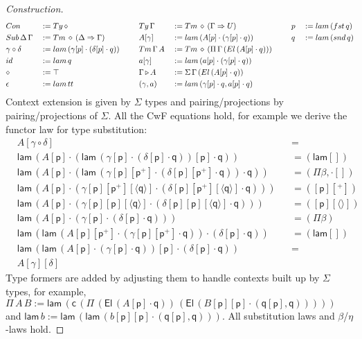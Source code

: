 \documentclass[a4paper,UKenglish,cleveref, autoref, thm-restate]{lipics-v2021}
\newcommand{\Ra}{\Rightarrow}
\newcommand{\Ty}{\mathsf{Ty}}
\newcommand{\Tm}{\mathsf{Tm}}
\newcommand{\Con}{\mathsf{Con}}
\newcommand{\Sub}{\mathsf{Sub}}
\newcommand{\p}{\mathsf{p}}
\newcommand{\q}{\mathsf{q}}
\newcommand{\ext}{\mathop{\triangleright}}
\newcommand{\lam}{\mathsf{lam}}
\newcommand{\U}{\mathsf{U}}
\newcommand{\El}{\mathsf{El}}
\newcommand{\cd}{\mathsf{c}}
\renewcommand{\tt}{\mathsf{tt}}
\newcommand{\fst}{\mathsf{fst}}
\newcommand{\snd}{\mathsf{snd}}
\newcommand{\id}{\mathsf{id}}
\begin{document}
\begin{proof}[Construction]
\begin{alignat*}{10}
    & \Con && := \Ty\,\diamond                                           && \Ty\,\Gamma && := \Tm\,\diamond\,(\Gamma\Ra\U) && \p && := \lam\,(\fst\,\q) \\                     
    & \Sub\,\Delta\,\Gamma && := \Tm\,\diamond\,(\Delta\Ra\Gamma)        && A[\gamma] && := \lam\,(A[\p]\cdot(\gamma[\p]\cdot\q)) && \q && := \lam\,(\snd\,\q) \\
    & \gamma\circ\delta && := \lam\,(\gamma[\p]\cdot(\delta[\p]\cdot\q)) \hspace{1.5em} && \Tm\,\Gamma\,A && := \Tm\,\diamond\,(\Pi\,\Gamma\,(\El\,(A[\p]\cdot\q)))\hspace{1.5em} \\   
    & \id && := \lam\,\q                                                 && a[\gamma] && := \lam\,(a[\p]\cdot(\gamma[\p]\cdot\q)) \\                      
    & \diamond && := \top                                                && \Gamma\ext A && := \Sigma\,\Gamma\,(\El\,(A[\p]\cdot\q)) \\                   
    & \epsilon && := \lam\,\tt                                           && (\gamma,a) && := \lam\,(\gamma[\p]\cdot\q,a[\p]\cdot\q)
  \end{alignat*}
  Context extension is given by $\Sigma$ types and pairing/projections
  by pairing/projections of $\Sigma$. All the CwF equations hold, for
  example we derive the functor law for type substitution:
  \begin{equation}
  \begin{alignedat}{10}\label{eq:functor}
    & A[\gamma\circ\delta] && {=} \\
    & \lam\,(A[\p]\cdot(\lam\,(\gamma[\p]\cdot(\delta[\p]\cdot\q))[\p]\cdot\q)) && {=}(\lam[]) \\
    & \lam\,(A[\p]\cdot(\lam\,(\gamma[\p][\p^+]\cdot(\delta[\p][\p^+]\cdot\q))\cdot\q)) && {=}(\Pi\beta, {\cdot}[]) \\
    & \lam\,(A[\p]\cdot(\gamma[\p][\p^+][\langle\q\rangle]\cdot(\delta[\p][\p^+][\langle\q\rangle]\cdot\q))) && {=}([\p][^+]) \\
    & \lam\,(A[\p]\cdot(\gamma[\p][\p][\langle\q\rangle]\cdot(\delta[\p][\p][\langle\q\rangle]\cdot\q))) && {=}([\p][\langle\rangle]) \\
    & \lam\,(A[\p]\cdot(\gamma[\p]\cdot(\delta[\p]\cdot\q))) && {=}(\Pi\beta) \\
    & \lam\,(\lam\,(A[\p][\p^+]\cdot(\gamma[\p][\p^+]\cdot\q))\cdot(\delta[\p]\cdot\q))\,\, && {=}(\lam[]) \\
    & \lam\,(\lam\,(A[\p]\cdot(\gamma[\p]\cdot\q))[\p]\cdot(\delta[\p]\cdot\q)) && {=} \\
    & A[\gamma][\delta]
  \end{alignedat}
  \end{equation}
  Type formers are added by adjusting them to handle contexts built up
  by $\Sigma$ types, for example,
  $
  \Pi\,A\,B := \lam\,(\cd\,(\Pi\,(\El\,(A[\p]\cdot\q))\,(\El\,(B[\p][\p]\cdot(\q[\p],\q)))))
  $
  and $\lam\,b := \lam\,(\lam\,(b[\p][\p]\cdot(\q[\p],\q)))$. All
  substitution laws and $\beta$/$\eta$-laws hold.
\end{proof}
\end{document}
